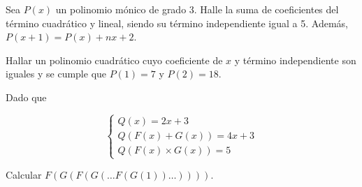 \begin{section-problem}
    Sea $P(x)$ un polinomio mónico de grado 3.
    Halle la suma de coeficientes del término cuadrático y lineal, siendo su término independiente igual a 5.
    Además, $P(x + 1) = P(x) + nx + 2$.
\end{section-problem}

\begin{section-problem}
    Hallar un polinomio cuadrático cuyo coeficiente de $x$ y término independiente son iguales y se cumple que $P(1) = 7$ y $P(2) = 18$.
\end{section-problem}

\begin{section-problem}
    Dado que

    \[
        \begin{cases}
            Q(x) = 2x + 3 \\
            Q( F(x) + G(x) ) = 4x + 3 \\
            Q( F(x) \times G(x) ) = 5
        \end{cases}
    \]

    Calcular $F(G(F(G(\dots F(G(1))\dots))))$.
\end{section-problem}